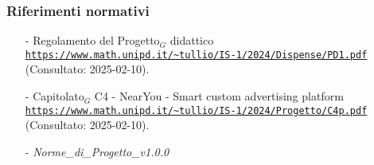 \documentclass[10pt]{article}
\begin{document}
\subsubsection{Riferimenti normativi}
\begin{itemize}
    \item[-] Regolamento del Progetto$_G$ didattico  \\
    \textcolor{blue}{\texttt{\url{https://www.math.unipd.it/~tullio/IS-1/2024/Dispense/PD1.pdf}}}\\ (Consultato: 2025-02-10).
    \item[-] Capitolato$_G$ C4 - NearYou - Smart custom advertising platform\\
    \textcolor{blue}{\texttt{\url{https://www.math.unipd.it/~tullio/IS-1/2024/Progetto/C4p.pdf}}}\\ (Consultato: 2025-02-10).
    \item[-] \textit{Norme\_di\_Progetto\_v1.0.0}
\end{itemize}
\end{document}
